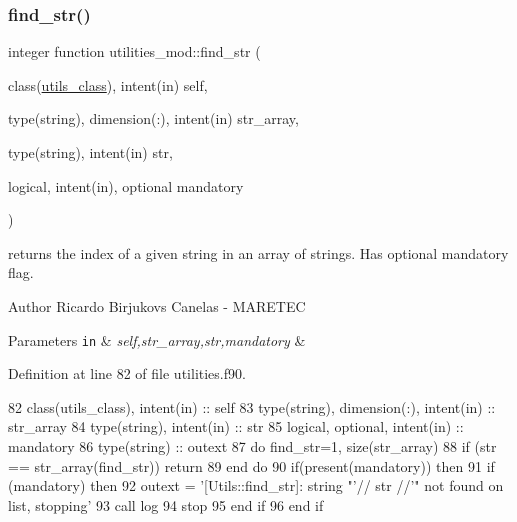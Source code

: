 \subsubsection{\texorpdfstring{find\+\_\+str()}{find\_str()}}
{\footnotesize\ttfamily integer function utilities\+\_\+mod\+::find\+\_\+str (\begin{DoxyParamCaption}\item[{class(\mbox{\hyperlink{structutilities__mod_1_1utils__class}{utils\+\_\+class}}), intent(in)}]{self,  }\item[{type(string), dimension(\+:), intent(in)}]{str\+\_\+array,  }\item[{type(string), intent(in)}]{str,  }\item[{logical, intent(in), optional}]{mandatory }\end{DoxyParamCaption})\hspace{0.3cm}{\ttfamily [private]}}



returns the index of a given string in an array of strings. Has optional mandatory flag. 

\begin{DoxyAuthor}{Author}
Ricardo Birjukovs Canelas -\/ M\+A\+R\+E\+T\+EC 
\end{DoxyAuthor}

\begin{DoxyParams}[1]{Parameters}
\mbox{\tt in}  & {\em self,str\+\_\+array,str,mandatory} & \\
\hline
\end{DoxyParams}


Definition at line 82 of file utilities.\+f90.


\begin{DoxyCode}
82     \textcolor{keywordtype}{class}(utils\_class), \textcolor{keywordtype}{intent(in)} :: self
83     \textcolor{keywordtype}{type}(string), \textcolor{keywordtype}{dimension(:)}, \textcolor{keywordtype}{intent(in)} :: str\_array
84     \textcolor{keywordtype}{type}(string), \textcolor{keywordtype}{intent(in)} :: str
85     \textcolor{keywordtype}{logical}, \textcolor{keywordtype}{optional}, \textcolor{keywordtype}{intent(in)} :: mandatory
86     \textcolor{keywordtype}{type}(string) :: outext
87     \textcolor{keywordflow}{do} find\_str=1, \textcolor{keyword}{size}(str\_array)
88         \textcolor{keywordflow}{if} (str == str\_array(find\_str)) \textcolor{keywordflow}{return}
89 \textcolor{keywordflow}{    end do}
90     \textcolor{keywordflow}{if}(\textcolor{keyword}{present}(mandatory)) \textcolor{keywordflow}{then}
91         \textcolor{keywordflow}{if} (mandatory) \textcolor{keywordflow}{then}
92             outext = \textcolor{stringliteral}{'[Utils::find\_str]: string "'}// str //\textcolor{stringliteral}{'" not found on list, stopping'}
93             \textcolor{keyword}{call }log%
94             stop
95 \textcolor{keywordflow}{        end if}
96 \textcolor{keywordflow}{    end if}
\end{DoxyCode}
\mbox{\label{namespaceutilities__mod_ad6e463f7e5fc49fe4fcd5464326ade01}} 
